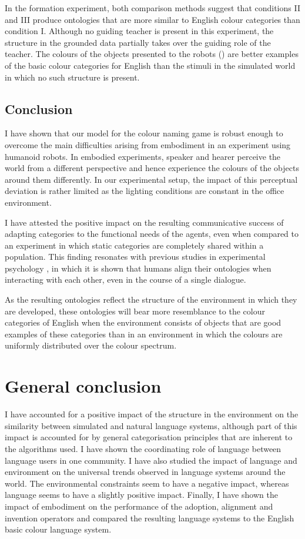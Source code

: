 In the formation experiment, both comparison methods suggest that
conditions II and III produce ontologies that are more similar to
English colour categories than condition I. Although no guiding teacher is present in this
experiment, the structure in the
grounded data partially takes over the guiding role of the
teacher. The colours of the objects presented to the robots () are better examples of the basic colour
categories for English than the stimuli in the simulated world in
which no such structure is present.

\subsection{Conclusion}

I have shown that our model for the colour naming game is robust
enough to overcome the main difficulties arising from embodiment in an
experiment using humanoid robots. In embodied experiments, speaker and
hearer perceive the world from a different perspective and hence
experience the colours of the objects around them differently. In our
experimental setup, the impact of this perceptual deviation is rather
limited as the lighting conditions are constant in the office
environment.

I have attested the positive impact on the resulting communicative
success of adapting categories to the functional needs of the agents,
even when compared to an experiment in which static categories are
completely shared within a population. This finding resonates with
previous studies in experimental psychology
\citep{garrod94conversation}, in which it is shown that humans align
their ontologies when interacting with each other, even in the course
of a single dialogue.

As the resulting ontologies reflect the structure of the environment
in which they are developed, these ontologies will bear more
resemblance to the colour categories of English when the environment
consists of objects that are good examples of these categories than in
an environment in which the colours are uniformly distributed over the
colour spectrum.

\section{General conclusion}

I have accounted for a positive impact of the structure in the
environment on the similarity between simulated and natural language
systems, although part of this impact is accounted for by general
categorisation principles that are inherent to the algorithms used. I
have shown the coordinating role of language between language users in
one community. I have also studied the impact of language and
environment on the universal trends observed in language systems
around the world. The environmental constraints seem to have a
negative impact, whereas language seems to have a slightly positive
impact. Finally, I have shown the impact of embodiment on the
performance of the adoption, alignment and invention operators and
compared the resulting language systems to the English basic colour
language system.

\newpage
\thispagestyle{empty}